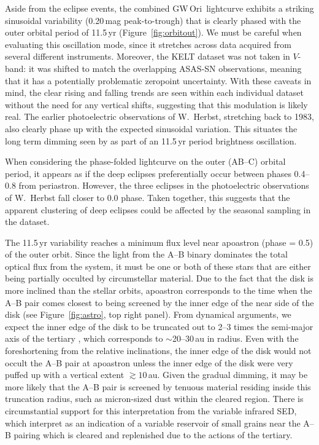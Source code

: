 \documentclass[twocolumn]{aastex61}
\newcommand{\obj}{GW\,Ori}
\begin{document}
Aside from the eclipse events, the combined \obj\ lightcurve exhibits a striking sinusoidal variability (0.20\,mag peak-to-trough) that is clearly phased with the outer orbital period of 11.5\,yr (Figure~\ref{fig:orbitout}). We must be careful when evaluating this oscillation mode, since it stretches across data acquired from several different instruments. Moreover, the KELT dataset was not taken in $V$-band: it was shifted to match the overlapping ASAS-SN observations, meaning that it has a potentially problematic zeropoint uncertainty. With these caveats in mind, the clear rising and falling trends are seen within each individual dataset without the need for any vertical shifts, suggesting that this modulation is likely real. The earlier photoelectric observations of W.~Herbst, stretching back to 1983, also clearly phase up with the expected sinusoidal variation. This situates the long term dimming seen by \citet{shevchenko98} as part of an 11.5\,yr period brightness oscillation.

When considering the phase-folded lightcurve on the outer (AB--C) orbital period, it appears as if the deep eclipses preferentially occur between phases 0.4--0.8 from periastron. However, the three eclipses in the photoelectric observations of W.~Herbst fall closer to 0.0 phase. Taken together, this suggests that the apparent clustering of deep eclipses could be affected by the seasonal sampling in the dataset.

The 11.5\,yr variability reaches a minimum flux level near apoastron (phase = 0.5) of the outer orbit. Since the light from the A--B binary dominates the total optical flux from the system, it must be one or both of these stars that are either being partially occulted by circumstellar material. Due to the fact that the disk is more inclined than the stellar orbits, apoastron corresponds to the time when the A--B pair comes closest to being screened by the inner edge of the near side of the disk (see Figure~\ref{fig:astro}, top right panel). From dynamical arguments, we expect the inner edge of the disk to be truncated out to 2--3 times the semi-major axis of the tertiary \citep{artymowicz94}, which corresponds to $\sim$20--30\,au in radius. Even with the foreshortening from the relative inclinations, the inner edge of the disk would not occult the A--B pair at apoastron unless the inner edge of the disk were very puffed up with a vertical extent $\gtrsim 10\,$au. Given the gradual dimming, it may be more likely that the A--B pair is screened by tenuous material residing inside this truncation radius, such as micron-sized dust within the cleared region. There is circumstantial support for this interpretation from the variable infrared SED, which \citet{fang14} interpret as an indication of a variable reservoir of small grains near the A--B pairing which is cleared and replenished due to the actions of the tertiary.
\end{document}
